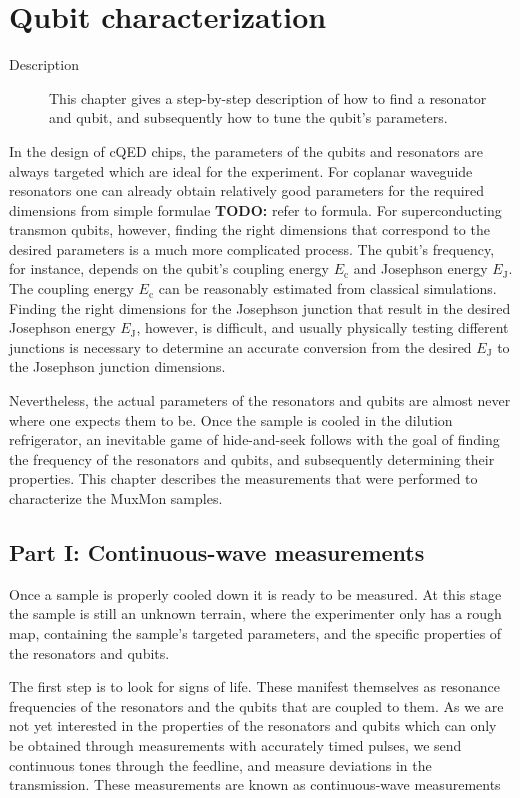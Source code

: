 \documentclass[12pt]{report}
\newcommand{\Ec}{E_\text{c}}
\newcommand{\Ej}{E_\text{J}}
\begin{document}
  \chapter{Qubit characterization}
    \begin{description}
     \item[Description] This chapter gives a step-by-step description of how to find a resonator and qubit, and subsequently how to tune the qubit's parameters.
     \end{description}

    In the design of cQED chips, the parameters of the qubits and resonators are always targeted which are ideal for the experiment.
    For coplanar waveguide resonators one can already obtain relatively good parameters for the required dimensions from simple formulae \textbf{TODO:} refer to formula.
    For superconducting transmon qubits, however, finding the right dimensions that correspond to the desired parameters is a much more complicated process.
    The qubit's frequency, for instance, depends on the qubit's coupling energy $\Ec$ and Josephson energy $\Ej$. The coupling energy $\Ec$ can be reasonably estimated from classical simulations. Finding the right dimensions for the Josephson junction that result in the desired Josephson energy $\Ej$, however, is difficult, and usually physically testing different junctions is necessary to determine an accurate conversion from the desired $\Ej$ to the Josephson junction dimensions.

    Nevertheless, the actual parameters of the resonators and qubits are almost never where one expects them to be. Once the sample is cooled in the dilution refrigerator, an inevitable game of hide-and-seek follows with the goal of finding the frequency of the resonators and qubits, and subsequently determining their properties. This chapter describes the measurements that were performed to characterize the MuxMon samples.

    \section{Part I: Continuous-wave measurements}

      Once a sample is properly cooled down it is ready to be measured. At this stage the sample is still an unknown terrain, where the experimenter only has a rough map, containing the sample's targeted parameters, and the specific properties of the resonators and qubits.

      The first step is to look for signs of life. These manifest themselves as resonance frequencies of the resonators and the qubits that are coupled to them. As we are not yet interested in the properties of the resonators and qubits which can only be obtained through measurements with accurately timed pulses, we send continuous tones through the feedline, and measure deviations in the transmission. These measurements are known as continuous-wave measurements
\end{document}
